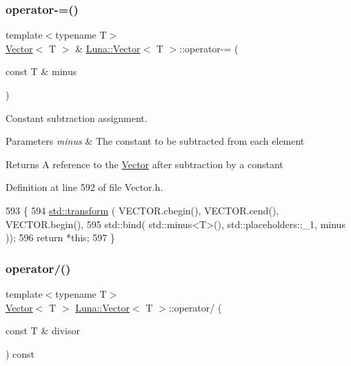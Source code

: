 \subsubsection{\texorpdfstring{operator-\/=()}{operator-=()}\hspace{0.1cm}{\footnotesize\ttfamily [2/2]}}
{\footnotesize\ttfamily template$<$typename T$>$ \\
\hyperlink{classLuna_1_1Vector}{Vector}$<$ T $>$ \& \hyperlink{classLuna_1_1Vector}{Luna\+::\+Vector}$<$ T $>$\+::operator-\/= (\begin{DoxyParamCaption}\item[{const T \&}]{minus }\end{DoxyParamCaption})\hspace{0.3cm}{\ttfamily [inline]}}



Constant subtraction assignment. 


\begin{DoxyParams}{Parameters}
{\em minus} & The constant to be subtracted from each element \\
\hline
\end{DoxyParams}
\begin{DoxyReturn}{Returns}
A reference to the \hyperlink{classLuna_1_1Vector}{Vector} after subtraction by a constant 
\end{DoxyReturn}


Definition at line 592 of file Vector.\+h.


\begin{DoxyCode}
593   \{
594     \hyperlink{namespaceHeat__plot_aeaa6785bedcad63b4bd40e8cb1bad8a0}{std::transform} ( VECTOR.cbegin(), VECTOR.cend(), VECTOR.begin(),
595                      std::bind( std::minus<T>(), std::placeholders::\_1, minus ));
596     \textcolor{keywordflow}{return} *\textcolor{keyword}{this};
597   \}
\end{DoxyCode}
\mbox{\label{classLuna_1_1Vector_aabb416e2f6237ad98c24c7059fc742eb}} 
\subsubsection{\texorpdfstring{operator/()}{operator/()}}
{\footnotesize\ttfamily template$<$typename T$>$ \\
\hyperlink{classLuna_1_1Vector}{Vector}$<$ T $>$ \hyperlink{classLuna_1_1Vector}{Luna\+::\+Vector}$<$ T $>$\+::operator/ (\begin{DoxyParamCaption}\item[{const T \&}]{divisor }\end{DoxyParamCaption}) const\hspace{0.3cm}{\ttfamily [inline]}}



